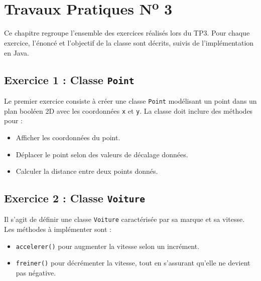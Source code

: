 \chapter{Travaux Pratiques N\textsuperscript{o} 3}

Ce chapitre regroupe l'ensemble des exercices r\'{e}alis\'{e}s lors du TP3. Pour chaque exercice, l'\'{e}nonc\'{e} et l'objectif de la classe sont d\'{e}crits, suivis de l'impl\'{e}mentation en Java.

\section{Exercice 1 : Classe \texttt{Point}}
Le premier exercice consiste \`{a} cr\'{e}er une classe \texttt{Point} mod\'{e}lisant un point dans un plan bool\'{e}en 2D avec les coordonn\'{e}es \texttt{x} et \texttt{y}. La classe doit inclure des m\'{e}thodes pour :
\begin{itemize}
    \item Afficher les coordonn\'{e}es du point.
    \item D\'{e}placer le point selon des valeurs de d\'{e}calage donn\'{e}es.
    \item Calculer la distance entre deux points donn\'{e}s.
\end{itemize}



\section{Exercice 2 : Classe \texttt{Voiture}}
Il s'agit de d\'{e}finir une classe \texttt{Voiture} caract\'{e}ris\'{e}e par sa marque et sa vitesse. Les m\'{e}thodes \`{a} impl\'{e}menter sont :
\begin{itemize}
    \item \texttt{accelerer()} pour augmenter la vitesse selon un incr\'{e}ment.
    \item \texttt{freiner()} pour d\'{e}cr\'{e}menter la vitesse, tout en s'assurant qu'elle ne devient pas n\'{e}gative.
\end{itemize}



